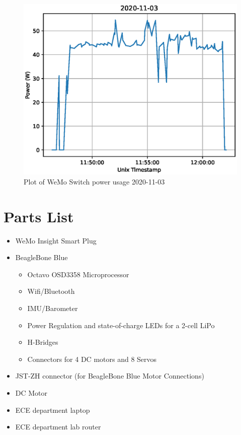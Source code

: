 \documentclass[letterpaper,12pt]{article}   %
\begin{document}
\begin{figure}[H]
    \centering
    \includegraphics[scale=0.5]{figs/powerPlot2020-11-03.eps}
    \caption{Plot of WeMo Switch power usage 2020-11-03}
    \label{fig:powerPlotWeMoSwitch}
\end{figure}

\section{Parts List}
\begin{itemize}
    \item WeMo Insight Smart Plug
    \item BeagleBone Blue
    \begin{itemize}
        \item Octavo OSD3358 Microprocessor
        \item Wifi/Bluetooth
        \item IMU/Barometer
        \item Power Regulation and state-of-charge LEDs for a 2-cell LiPo
        \item H-Bridges
        \item Connectors for 4 DC motors and 8 Servos
    \end{itemize}
    \item JST-ZH connector (for BeagleBone Blue Motor Connections)
    \item DC Motor
    \item ECE department laptop
    \item ECE department lab router
\end{itemize}
\end{document}
